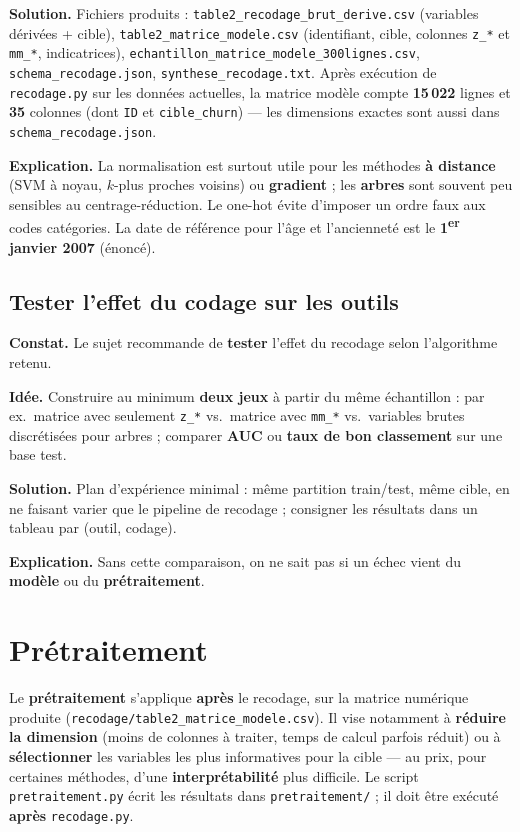 \documentclass[11pt,a4paper]{article}
\begin{document}
\textbf{Solution.} Fichiers produits : \texttt{table2\_recodage\_brut\_derive.csv} (variables dérivées + cible), \texttt{table2\_matrice\_modele.csv} (identifiant, cible, colonnes \texttt{z\_*} et \texttt{mm\_*}, indicatrices), \texttt{echantillon\_matrice\_modele\_300lignes.csv}, \texttt{schema\_recodage.json}, \texttt{synthese\_recodage.txt}. Après exécution de \texttt{recodage.py} sur les données actuelles, la matrice modèle compte \textbf{15\,022} lignes et \textbf{35} colonnes (dont \texttt{ID} et \texttt{cible\_churn}) --- les dimensions exactes sont aussi dans \texttt{schema\_recodage.json}.

\textbf{Explication.} La normalisation est surtout utile pour les méthodes \textbf{à distance} (SVM à noyau, $k$-plus proches voisins) ou \textbf{gradient} ; les \textbf{arbres} sont souvent peu sensibles au centrage-réduction. Le one-hot évite d'imposer un ordre faux aux codes catégories. La date de référence pour l'âge et l'ancienneté est le \textbf{1\textsuperscript{er} janvier 2007} (énoncé).

\subsection{Tester l'effet du codage sur les outils}

\textbf{Constat.} Le sujet recommande de \textbf{tester} l'effet du recodage selon l'algorithme retenu.

\textbf{Idée.} Construire au minimum \textbf{deux jeux} à partir du même échantillon : par ex.\ matrice avec seulement \texttt{z\_*} vs.\ matrice avec \texttt{mm\_*} vs.\ variables brutes discrétisées pour arbres ; comparer \textbf{AUC} ou \textbf{taux de bon classement} sur une base test.

\textbf{Solution.} Plan d'expérience minimal : même partition train/test, même cible, en ne faisant varier que le pipeline de recodage ; consigner les résultats dans un tableau par (outil, codage).

\textbf{Explication.} Sans cette comparaison, on ne sait pas si un échec vient du \textbf{modèle} ou du \textbf{prétraitement}.

\section{Prétraitement}

Le \textbf{prétraitement} s'applique \textbf{après} le recodage, sur la matrice numérique produite (\texttt{recodage/table2\_matrice\_modele.csv}). Il vise notamment à \textbf{réduire la dimension} (moins de colonnes à traiter, temps de calcul parfois réduit) ou à \textbf{sélectionner} les variables les plus informatives pour la cible --- au prix, pour certaines méthodes, d'une \textbf{interprétabilité} plus difficile. Le script \texttt{pretraitement.py} écrit les résultats dans \texttt{pretraitement/} ; il doit être exécuté \textbf{après} \texttt{recodage.py}.
\end{document}
